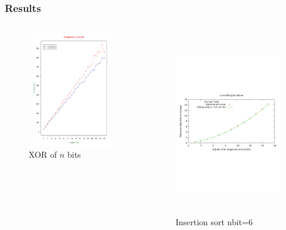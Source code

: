 \documentclass{beamer}
\begin{document}
\begin{frame} \frametitle{Results}

\begin{columns}
\begin{column}[c]{3cm}
\begin{figure}%
\vspace{-3ex}
\centering
\includegraphics[width=5cm, height=5cm]{f4.pdf} 
\caption{XOR of $n$ bits} 
\end{figure}
\end{column}
\begin{column}[c]{5cm}
\begin{figure}
\vspace{-2cm}
\centering
\includegraphics[width=6cm, height=8cm]{fsort1.pdf} 
\caption{Insertion sort nbit=6} 
\end{figure}
\end{column}
\end{columns}

\end{frame}
\end{document}
